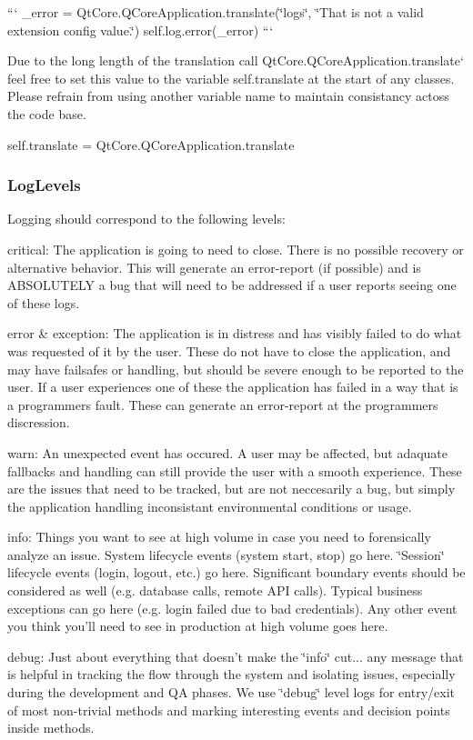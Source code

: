 ``` \-\_\-error = Qt\-Core.\-Q\-Core\-Application.\-translate(\char`\"{}logs\char`\"{}, \char`\"{}\-That is not a valid extension config value.\char`\"{}) self.\-log.\-error(\-\_\-error) ```

Due to the long length of the translation call {\ttfamily Qt\-Core.\-Q\-Core\-Application.\-translate}` feel free to set this value to the variable self.\-translate at the start of any classes. Please refrain from using another variable name to maintain consistancy actoss the code base.

{\ttfamily self.\-translate = Qt\-Core.\-Q\-Core\-Application.\-translate}

\subsubsection*{Log\-Levels}

Logging should correspond to the following levels\-:


\begin{DoxyItemize}
\item critical\-: The application is going to need to close. There is no possible recovery or alternative behavior. This will generate an error-\/report (if possible) and is A\-B\-S\-O\-L\-U\-T\-E\-L\-Y a bug that will need to be addressed if a user reports seeing one of these logs.
\item error \& exception\-: The application is in distress and has visibly failed to do what was requested of it by the user. These do not have to close the application, and may have failsafes or handling, but should be severe enough to be reported to the user. If a user experiences one of these the application has failed in a way that is a programmers fault. These can generate an error-\/report at the programmers discression.
\item warn\-: An unexpected event has occured. A user may be affected, but adaquate fallbacks and handling can still provide the user with a smooth experience. These are the issues that need to be tracked, but are not neccesarily a bug, but simply the application handling inconsistant environmental conditions or usage.
\item info\-: Things you want to see at high volume in case you need to forensically analyze an issue. System lifecycle events (system start, stop) go here. \char`\"{}\-Session\char`\"{} lifecycle events (login, logout, etc.) go here. Significant boundary events should be considered as well (e.\-g. database calls, remote A\-P\-I calls). Typical business exceptions can go here (e.\-g. login failed due to bad credentials). Any other event you think you'll need to see in production at high volume goes here.
\item debug\-: Just about everything that doesn't make the \char`\"{}info\char`\"{} cut... any message that is helpful in tracking the flow through the system and isolating issues, especially during the development and Q\-A phases. We use \char`\"{}debug\char`\"{} level logs for entry/exit of most non-\/trivial methods and marking interesting events and decision points inside methods.
\end{DoxyItemize}

